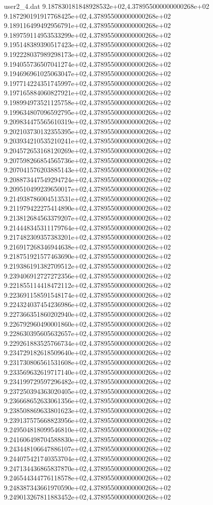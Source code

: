 \begin{filecontents}{user2_4.dat}
9.187830181848928532e+02,4.378955000000000268e+02
9.187290191917768425e+02,4.378955000000000268e+02
9.189116499492956791e+02,4.378955000000000268e+02
9.189759114953533299e+02,4.378955000000000268e+02
9.195148389390517423e+02,4.378955000000000268e+02
9.192228037989298173e+02,4.378955000000000268e+02
9.194055736507041274e+02,4.378955000000000268e+02
9.194696961025063047e+02,4.378955000000000268e+02
9.197714224351745997e+02,4.378955000000000268e+02
9.197165884060827921e+02,4.378955000000000268e+02
9.198994973521125758e+02,4.378955000000000268e+02
9.199634807096592795e+02,4.378955000000000268e+02
9.209834475565610319e+02,4.378955000000000268e+02
9.202103730132355395e+02,4.378955000000000268e+02
9.203934210535210241e+02,4.378955000000000268e+02
9.204572653168120269e+02,4.378955000000000268e+02
9.207598266854565736e+02,4.378955000000000268e+02
9.207041576203885143e+02,4.378955000000000268e+02
9.208873447549294724e+02,4.378955000000000268e+02
9.209510499239650017e+02,4.378955000000000268e+02
9.214938786004513531e+02,4.378955000000000268e+02
9.211979422275414890e+02,4.378955000000000268e+02
9.213812684563379207e+02,4.378955000000000268e+02
9.214448345311179764e+02,4.378955000000000268e+02
9.217482309357383201e+02,4.378955000000000268e+02
9.216917268346944638e+02,4.378955000000000268e+02
9.218751921577463690e+02,4.378955000000000268e+02
9.219386191382709512e+02,4.378955000000000268e+02
9.239406912727272356e+02,4.378955000000000268e+02
9.221855114418472112e+02,4.378955000000000268e+02
9.223691158591548174e+02,4.378955000000000268e+02
9.224324037454236986e+02,4.378955000000000268e+02
9.227366351860202940e+02,4.378955000000000268e+02
9.226792960490001860e+02,4.378955000000000268e+02
9.228630395605632657e+02,4.378955000000000268e+02
9.229261883525766734e+02,4.378955000000000268e+02
9.234729182618509640e+02,4.378955000000000268e+02
9.231730806561531608e+02,4.378955000000000268e+02
9.233569632619717140e+02,4.378955000000000268e+02
9.234199729597296482e+02,4.378955000000000268e+02
9.237250394363020405e+02,4.378955000000000268e+02
9.236668652633061356e+02,4.378955000000000268e+02
9.238508869633801623e+02,4.378955000000000268e+02
9.239137575668823956e+02,4.378955000000000268e+02
9.249504818099546810e+02,4.378955000000000268e+02
9.241606498704588830e+02,4.378955000000000268e+02
9.243448106647886107e+02,4.378955000000000268e+02
9.244075421740353704e+02,4.378955000000000268e+02
9.247134436865837870e+02,4.378955000000000268e+02
9.246544344776118578e+02,4.378955000000000268e+02
9.248387343661970590e+02,4.378955000000000268e+02
9.249013267811883452e+02,4.378955000000000268e+02

\end{filecontents}

